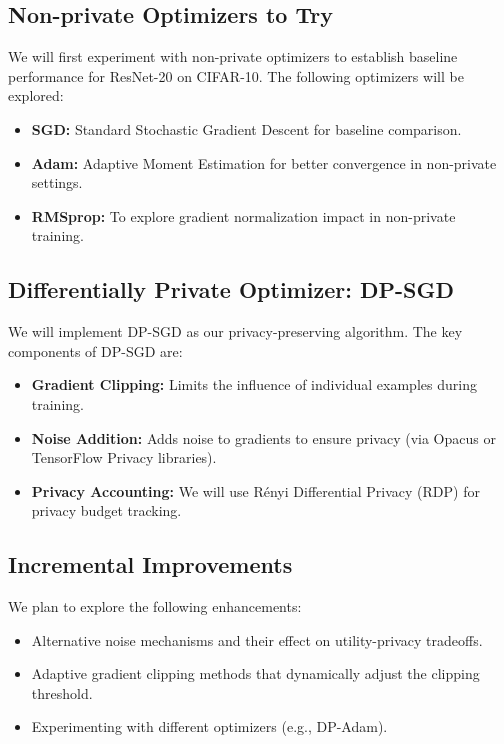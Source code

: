\documentclass{article}
\begin{document}
    \subsection{Non-private Optimizers to Try}\label{subsec:non-private-optimizers-to-try}
    We will first experiment with non-private optimizers to establish baseline performance for ResNet-20 on CIFAR-10.
    The following optimizers will be explored:
    \begin{itemize}
        \item \textbf{SGD:} Standard Stochastic Gradient Descent for baseline comparison.
        \item \textbf{Adam:} Adaptive Moment Estimation for better convergence in non-private settings.
        \item \textbf{RMSprop:} To explore gradient normalization impact in non-private training.
    \end{itemize}

    \subsection{Differentially Private Optimizer: DP-SGD}\label{subsec:differentially-private-optimizer:-dp-sgd}
    We will implement DP-SGD as our privacy-preserving algorithm.
    The key components of DP-SGD are:
    \begin{itemize}
        \item \textbf{Gradient Clipping:} Limits the influence of individual examples during training.
        \item \textbf{Noise Addition:} Adds noise to gradients to ensure privacy (via Opacus or TensorFlow Privacy libraries).
        \item \textbf{Privacy Accounting:} We will use Rényi Differential Privacy (RDP) for privacy budget tracking.
    \end{itemize}

    \subsection{Incremental Improvements}\label{subsec:incremental-improvements}
    We plan to explore the following enhancements:
    \begin{itemize}
        \item Alternative noise mechanisms and their effect on utility-privacy tradeoffs.
        \item Adaptive gradient clipping methods that dynamically adjust the clipping threshold.
        \item Experimenting with different optimizers (e.g., DP-Adam).
    \end{itemize}
\end{document}
